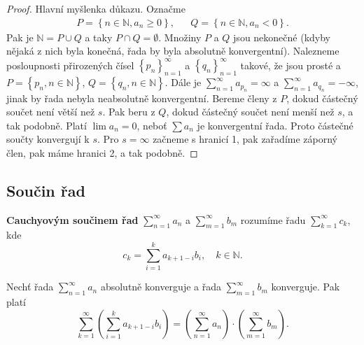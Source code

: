 \begin{proof}
	Hlavní myšlenka důkazu. Označme
	\begin{align*}
	P = \left \{ n \in \mathbb N , a_n \geq 0 \right \},  && Q = \left \{ n \in \mathbb N , a_n < 0 \right \}.
\end{align*}
Pak je $\mathbb N = P \cup Q$ a taky $P\cap Q = \emptyset$. Množiny $P$ a $Q$ jsou nekonečné (kdyby nějaká z nich
byla konečná, řada by byla absolutně konvergentní). Nalezneme posloupnosti přirozených čísel
$\left \{ p_n \right \}_{n=1}^\infty $ a $\left \{ q_n \right \}_{n=1}^\infty $ takové, že jsou prosté
a $P = \left \{ p_n, n \in \mathbb N  \right \} $, $Q = \left \{ q_n, n \in \mathbb N  \right \} $.
Dále je $\sum_{n=1}^\infty a_{p_n} = \infty$ a $\sum_{n=1}^\infty a_{q_n} = -\infty$, jinak by řada nebyla
neabsolutně konvergentní. Bereme členy z $P$, dokud částečný součet není větší než $s$. Pak beru z $Q$,
dokud částečný součet není menší než $s$, a tak podobně. Platí $\lim a_n = 0$, neboť $\sum a_n$ je konvergentní
řada. Proto částečné součty konvergují k $s$. Pro $s=\infty$ začneme s hranicí 1, pak zařadíme záporný člen,
pak máme hranici 2, a tak podobně.
\end{proof}

\subsection{Součin řad}
\begin{definice}
\textbf{Cauchyovým součinem řad} $\sum_{n=1}^{\infty} a_n$ a $\sum_{m=1}^{\infty} b_m$ rozumíme řadu $\sum_{k=1}^{\infty} c_k$, kde
\[
c_k = \sum_{i=1}^{k} a_{k+1-i} b_i, \quad k \in \mathbb{N}.
\]
\end{definice}

\begin{veta}[Mertens] \label{veta7.15}
Nechť řada $\sum_{n=1}^{\infty} a_n$ absolutně konverguje a řada $\sum_{m=1}^{\infty} b_m$ konverguje. Pak platí
\[
\sum_{k=1}^{\infty} \left( \sum_{i=1}^{k} a_{k+1-i} b_i \right)
=
\left( \sum_{n=1}^{\infty} a_n \right)\cdot
\left( \sum_{m=1}^{\infty} b_m \right).
\]
\end{veta}

